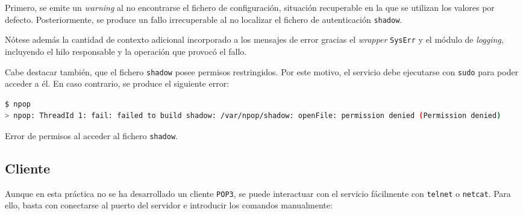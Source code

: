 \documentclass[a4paper]{CSMakotoTechnicalReport}
\begin{document}
Primero, se emite un \textit{warning} al no encontrarse el fichero de configuración, situación recuperable en la que se utilizan los valores por defecto. Posteriormente, se produce un fallo irrecuperable al no localizar el fichero de autenticación \texttt{shadow}.

Nótese además la cantidad de contexto adicional incorporado a los mensajes de error gracias el \textit{wrapper} \texttt{SysErr} y el módulo de \textit{logging}, incluyendo el hilo responsable y la operación que provocó el fallo.

Cabe destacar también, que el fichero \texttt{shadow} posee permisos restringidos. Por este motivo, el servicio debe ejecutarse con \texttt{sudo} para poder acceder a él. En caso contrario, se produce el siguiente error: 

\vspace{-6pt}
\begin{minipage}{\linewidth}
\begin{lstlisting}[language=bash, numbers=none, basicstyle=\footnotesize]
$ npop
> npop: ThreadId 1: fail: failed to build shadow: /var/npop/shadow: openFile: permission denied (Permission denied)
\end{lstlisting}
\captionsetup{type=lstlisting}
\caption{Error de permisos al acceder al fichero \texttt{shadow}.}
\end{minipage}


\subsection{Cliente}

Aunque en esta práctica no se ha desarrollado un cliente \texttt{POP3}, se puede interactuar con el servicio fácilmente con \texttt{telnet} o \texttt{netcat}. Para ello, basta con conectarse al puerto del servidor e introducir los comandos manualmente:
\end{document}
